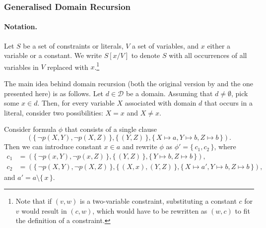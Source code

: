\subsubsection{Generalised Domain Recursion}\label{sec:dr}

\paragraph*{Notation.}
Let $S$ be a set of constraints or literals, $V$ a set of variables, and $x$
either a variable or a constant. We write $S[x/V]$ to denote $S$ with all
occurrences of all variables in $V$ replaced with $x$.\footnote{Note that if
  $(v, w)$ is a two-variable constraint, substituting a constant $c$ for $v$
  would result in $(c, w)$, which would have to be rewritten as $(w, c)$ to fit
  the definition of a constraint.}

The main idea behind domain recursion (both the original version by
\citet{DBLP:conf/nips/Broeck11} and the one presented here) is as follows. Let
$d \in \mathcal{D}$ be a domain. Assuming that $d \ne \emptyset$, pick some
$x \in d$. Then, for every variable $X$ associated with domain $d$ that occurs
in a literal, consider two possibilities: $X = x$ and $X \ne x$.

\begin{example}\label{example:dr}
  Consider formula $\phi$ that consists of a single clause
  \[
    (\{\, \neg p(X, Y), \neg p(X, Z) \,\}, \{\, (Y, Z) \,\}, \{\, X \mapsto a, Y \mapsto b, Z \mapsto b \,\}).
  \]
  Then we can introduce constant $x \in a$ and rewrite $\phi$ as $\phi' = \{\, c_{1}, c_{2} \,\}$, where
  \begin{align*}
    c_{1} &= (\{\, \neg p(x, Y), \neg p(x, Z) \,\}, \{\, (Y, Z) \,\}, \{\, Y \mapsto b, Z \mapsto b \,\}), \\
    c_{2} &= (\{\, \neg p(X, Y), \neg p(X, Z) \,\}, \{\, (X, x), (Y, Z) \,\}, \{\, X \mapsto a', Y \mapsto b, Z \mapsto b \,\}),
  \end{align*}
  and $a' = a \setminus \{\, x \,\}$.
\end{example}

